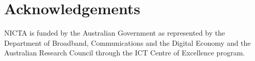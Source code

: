 \documentclass[letterpaper]{article}
\begin{document}
{\footnotesize

\section*{Acknowledgements}

NICTA is funded by the Australian Government as represented by
the Department of Broadband, Communications and the Digital
Economy and the Australian Research Council through the ICT
Centre of Excellence program.
}




\end{document}
